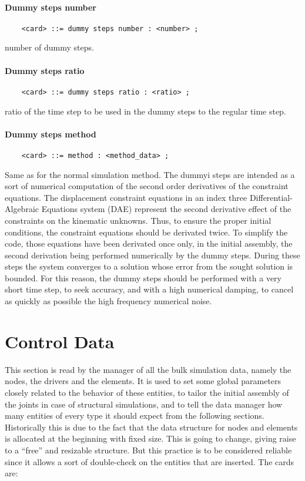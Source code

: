 \subsubsection{Dummy steps number}
\begin{verbatim}
    <card> ::= dummy steps number : <number> ;
\end{verbatim}
number of dummy steps.

\subsubsection{Dummy steps ratio}
\begin{verbatim}
    <card> ::= dummy steps ratio : <ratio> ;
\end{verbatim}
ratio of the time step to be used in the dummy steps to the regular
time step.

\subsubsection{Dummy steps method}
\begin{verbatim}
    <card> ::= method : <method_data> ;
\end{verbatim}
Same as for the normal simulation method. 
The dummyi steps are intended as a sort of numerical computation 
of the second order derivatives of the constraint equations. 
The displacement constraint equations in an index three 
Differential-Algebraic Equations system
(DAE) represent the second derivative effect of the constraints on the
kinematic unknowns. Thus, to ensure the proper initial conditions, the
constraint equations should be derivated twice. To simplify the code,
those equations have been derivated once only, in the initial assembly,
the second derivation being performed numerically by the dummy steps.
During these steps the system converges to a solution whose error from
the sought solution is bounded. For this reason, the dummy steps
should be performed with a very short time step, to seek accuracy, and
with a high numerical damping, to cancel as quickly as possible the high
frequency numerical noise.





\chapter{Control Data}
This section is read by the manager of all the bulk simulation data, namely
the nodes, the drivers and the elements. It is used to set some global
parameters closely related to the behavior of these entities, to tailor the
initial assembly of the joints in case of structural simulations, and to
tell the data manager how many entities of every type it should expect from
the following sections. Historically this is due to the fact that the data
structure for nodes and elements is allocated at the beginning with fixed
size. This is going to change, giving raise to a ``free'' and resizable
structure. But this practice is to be considered reliable since it allows a
sort of double-check on the entities that are inserted.
The cards are: 

